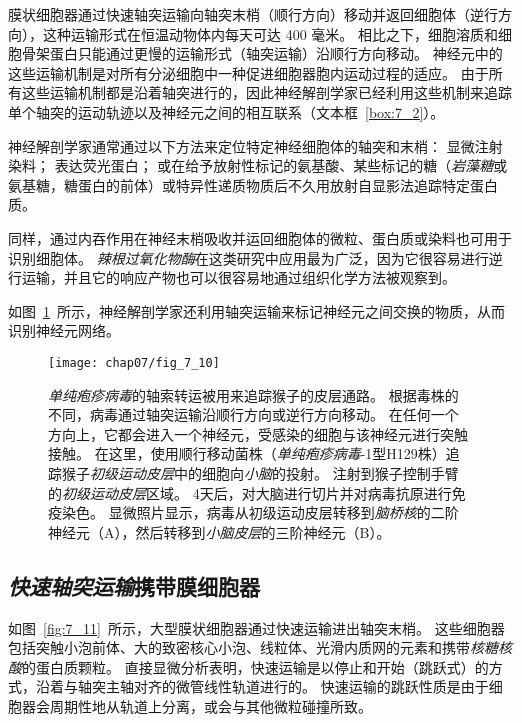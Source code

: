 膜状细胞器通过快速轴突运输向轴突末梢（顺行方向）移动并返回细胞体（逆行方向），这种运输形式在恒温动物体内每天可达 400 毫米。
相比之下，细胞溶质和细胞骨架蛋白只能通过更慢的运输形式（轴突运输）沿顺行方向移动。
神经元中的这些运输机制是对所有分泌细胞中一种促进细胞器胞内运动过程的适应。
由于所有这些运输机制都是沿着轴突进行的，因此神经解剖学家已经利用这些机制来追踪单个轴突的运动轨迹以及神经元之间的相互联系（文本框~\ref{box:7_2}）。

\begin{proposition}[利用轴突运输进行神经解剖学追踪] \label{box:7_2}
	
	\quad \quad 神经解剖学家通常通过以下方法来定位特定神经细胞体的轴突和末梢：
	显微注射染料；
	表达荧光蛋白；
	或在给予放射性标记的氨基酸、某些标记的糖（\textit{岩藻糖}或氨基糖，糖蛋白的前体）或特异性递质物质后不久用放射自显影法追踪特定蛋白质。
	
	\quad \quad 同样，通过内吞作用在神经末梢吸收并运回细胞体的微粒、蛋白质或染料也可用于识别细胞体。
	\textit{辣根过氧化物酶}在这类研究中应用最为广泛，因为它很容易进行逆行运输，并且它的响应产物也可以很容易地通过组织化学方法被观察到。
	
	\quad \quad 如图~\ref{fig:7_10}~所示，神经解剖学家还利用轴突运输来标记神经元之间交换的物质，从而识别神经元网络。
	
\end{proposition}


\begin{figure}[htbp]
	\centering
	\texttt{[image: chap07/fig\_7\_10]}
	\caption{\textit{单纯疱疹病毒}的轴索转运被用来追踪猴子的皮层通路。
		根据毒株的不同，病毒通过轴突运输沿顺行方向或逆行方向移动。
		在任何一个方向上，它都会进入一个神经元，受感染的细胞与该神经元进行突触接触。
		在这里，使用顺行移动菌株（\textit{单纯疱疹病毒}-1型H129株）追踪猴子\textit{初级运动皮层}中的细胞向\textit{小脑}的投射。
		注射到猴子控制手臂的\textit{初级运动皮层}区域。
		4天后，对大脑进行切片并对病毒抗原进行免疫染色。
		显微照片显示，病毒从初级运动皮层转移到\textit{脑桥核}的二阶神经元（A），然后转移到\textit{小脑皮层}的三阶神经元（B）。}
	\label{fig:7_10}
\end{figure}



\subsection{\textit{快速轴突运输}携带膜细胞器}

如图~\ref{fig:7_11}~所示，大型膜状细胞器通过快速运输进出轴突末梢。
这些细胞器包括突触小泡前体、大的致密核心小泡、线粒体、光滑内质网的元素和携带\textit{核糖核酸}的蛋白质颗粒。
直接显微分析表明，快速运输是以停止和开始（跳跃式）的方式，沿着与轴突主轴对齐的微管线性轨道进行的。
快速运输的跳跃性质是由于细胞器会周期性地从轨道上分离，或会与其他微粒碰撞所致。


